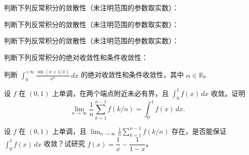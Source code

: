 \newpage
\noindent\begin{minipage}{\textwidth}
判断下列反常积分的敛散性（未注明范围的参数取实数）：
\end{minipage}\par\vfill
\noindent\begin{minipage}{\textwidth}
判断下列反常积分的敛散性（未注明范围的参数取实数）：
\end{minipage}\par\vfill
\noindent\begin{minipage}{\textwidth}
判断下列反常积分的敛散性（未注明范围的参数取实数）：
\end{minipage}\par\vfill
\newpage
\noindent\begin{minipage}{\textwidth}
判断下列反常积分的绝对收敛性和条件收敛性：
\end{minipage}\par\vfill
\noindent\begin{minipage}{\textwidth}
判断 $\displaystyle\int_0^{+\infty}\frac{\sin(x+1/x)}{x^\alpha}\,dx$ 的绝对收敛性和条件收敛性，其中 $\alpha\in\mathbb R$。
\end{minipage}\par\vfill
\noindent\begin{minipage}{\textwidth}
设 $f$ 在 $(0,1)$ 上单调，在两个端点附近未必有界，且 $\int_0^1f(x)\,dx$ 收敛。证明\[\lim_{n\to\infty}\frac1n\sum_{k=1}^{n-1}f(k/n)=\int_0^1f(x)\,dx.\]
\end{minipage}\par\vfill
\newpage
\noindent\begin{minipage}{\textwidth}
设 $f$ 在 $(0,1)$ 上单调，且 $\displaystyle\lim_{n\to\infty}\frac1n\sum_{k=1}^{n-1}f(k/n)$ 存在，是否能保证 $\int_0^1f(x)\,dx$ 收敛？试研究 $f(x)=\dfrac{1}{x}-\dfrac{1}{1-x}$。
\end{minipage}\par\vfill
